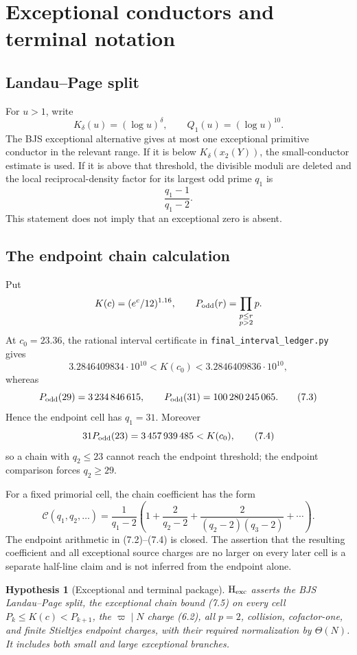 \documentclass[11pt]{article}
\newtheorem{hypothesis}[theorem]{Hypothesis}
\theoremstyle{definition}
\newcommand{\cert}[1]{\texttt{#1}}
\begin{document}
\section{Exceptional conductors and terminal notation}
\label{sec:exceptional}

\subsection{Landau--Page split}
\label{sec:landau}

For \(u>1\), write
\[
 K_\delta(u)=(\log u)^\delta,\qquad Q_1(u)=(\log u)^{10}.
\]
The BJS exceptional alternative gives at most one exceptional primitive
conductor in the relevant range.  If it is below \(K_\delta(x_2(Y))\), the
small-conductor estimate is used.  If it is above that threshold, the
divisible moduli are deleted and the local reciprocal-density factor for
its largest odd prime \(q_1\) is
\[
 \frac{q_1-1}{q_1-2}.
\tag{7.1}
\]
This statement does not imply that an exceptional zero is absent.

\subsection{The endpoint chain calculation}
\label{sec:chain}

Put
\[
 K(c)=(e^c/12)^{1.16},\qquad
 P_{\rm odd}(r)=\prod_{\substack{p\le r\\p>2}}p.
\]
At \(c_0=23.36\), the rational interval certificate in
\cert{final\_interval\_ledger.py} gives
\[
 3.2846409834\cdot10^{10}<K(c_0)
 <3.2846409836\cdot10^{10},
\tag{7.2}
\]
whereas
\[
 P_{\rm odd}(29)=3\,234\,846\,615,\qquad
 P_{\rm odd}(31)=100\,280\,245\,065.
\tag{7.3}
\]
Hence the endpoint cell has \(q_1=31\).  Moreover
\[
 31P_{\rm odd}(23)=3\,457\,939\,485<K(c_0),
\tag{7.4}
\]
so a chain with \(q_2\le23\) cannot reach the endpoint threshold; the
endpoint comparison forces \(q_2\ge29\).

For a fixed primorial cell, the chain coefficient has the form
\[
 \mathcal C(q_1,q_2,\ldots)
 =\frac1{q_1-2}
 \left(1+\frac2{q_2-2}
 +\frac2{(q_2-2)(q_3-2)}+\cdots\right).
\tag{7.5}
\]
The endpoint arithmetic in (7.2)--(7.4) is closed.  The assertion that the
resulting coefficient and all exceptional source charges are no larger on
every later cell is a separate half-line claim and is not inferred from
the endpoint alone.

\begin{hypothesis}[Exceptional and terminal package]
\label{hyp:exceptional}
\(\mathrm{H}_{\rm exc}\) asserts the BJS Landau--Page split, the exceptional
chain bound (7.5) on every cell \(P_k\le K(c)<P_{k+1}\), the
\(\varpi\mid N\) charge (6.2), all \(p=2\), collision, cofactor-one, and
finite Stieltjes endpoint charges, with their required normalization by
\(\Theta(N)\).  It includes both small and large exceptional branches.
\end{hypothesis}
\end{document}
